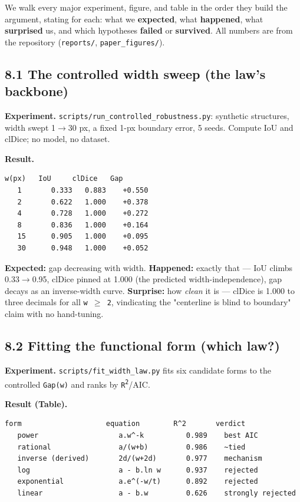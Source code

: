 \documentclass[11pt]{article}
\begin{document}
We walk every major experiment, figure, and table in the order they build the argument, stating for each: what we \textbf{expected}, what \textbf{happened}, what \textbf{surprised} us, and which hypotheses \textbf{failed} or \textbf{survived}. All numbers are from the repository (\texttt{reports/}, \texttt{paper\_figures/}).

\subsection*{8.1 The controlled width sweep (the law's backbone)}

\textbf{Experiment.} \texttt{scripts/run\_controlled\_robustness.py}: synthetic structures, width swept 1$\rightarrow$30 px, a fixed 1-px boundary error, 5 seeds. Compute IoU and clDice; no model, no dataset.

\textbf{Result.}
\begin{Verbatim}[breaklines=true,breakanywhere=true,fontsize=\footnotesize]
   w(px)   IoU     clDice   Gap
   1       0.333   0.883    +0.550
   2       0.622   1.000    +0.378
   4       0.728   1.000    +0.272
   8       0.836   1.000    +0.164
   15      0.905   1.000    +0.095
   30      0.948   1.000    +0.052
\end{Verbatim}

\textbf{Expected:} gap decreasing with width. \textbf{Happened:} exactly that --- IoU climbs 0.33$\rightarrow$0.95, clDice pinned at 1.000 (the predicted width-independence), gap decays as an inverse-width curve. \textbf{Surprise:} how \textit{clean} it is --- clDice is 1.000 to three decimals for all \texttt{w $\geq$ 2}, vindicating the "centerline is blind to boundary" claim with no hand-tuning.

\subsection*{8.2 Fitting the functional form (which law?)}

\textbf{Experiment.} \texttt{scripts/fit\_width\_law.py} fits six candidate forms to the controlled \texttt{Gap(w)} and ranks by \texttt{R\textsuperscript{2}}/AIC.

\textbf{Result (Table).}
\begin{Verbatim}[breaklines=true,breakanywhere=true,fontsize=\footnotesize]
   form                    equation        R^2       verdict
   power                   a.w^-k          0.989    best AIC
   rational                a/(w+b)         0.986    ~tied
   inverse (derived)       2d/(w+2d)       0.977    mechanism
   log                     a - b.ln w      0.937    rejected
   exponential             a.e^(-w/t)      0.892    rejected
   linear                  a - b.w         0.626    strongly rejected
\end{Verbatim}
\end{document}
